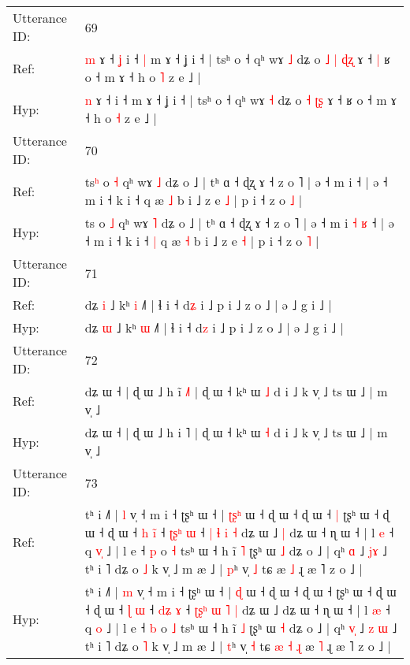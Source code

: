 \documentclass[10pt]{article}
\DeclareRobustCommand{\hl}[1]{{\textcolor{red}{#1}}}
\begin{document}
\begin{longtable}{ll}
 \\
\midrule
Utterance ID: & 69 \\
Ref: & \hl{m} ɤ ˧\hl{ }\hl{ʝ} i ˧\hl{ }\hl{|} m ɤ ˧ ʝ i ˧ | tsʰ o ˧ qʰ wɤ \hl{˩} dʑ o\hl{ }\hl{˩} \hl{|} \hl{ɖ}\hl{ʐ} ɤ ˧\hl{ }\hl{|} ʁ o ˧ m ɤ ˧ h o \hl{˥} z e ˩ |
 \\
Hyp: & \hl{n} ɤ ˧\hl{}\hl{} i ˧\hl{}\hl{} m ɤ ˧ ʝ i ˧ | tsʰ o ˧ qʰ wɤ \hl{˧} dʑ o\hl{}\hl{} \hl{˧} \hl{ʈ}\hl{ʂ} ɤ ˧\hl{}\hl{} ʁ o ˧ m ɤ ˧ h o \hl{˧} z e ˩ |
 \\
\midrule
Utterance ID: & 70 \\
Ref: & ts\hl{ʰ} o \hl{˧} qʰ wɤ \hl{˩} dʑ o ˩ | tʰ ɑ ˧ ɖʐ ɤ ˧ z o ˥ | ə ˧ m i\hl{}\hl{}\hl{}\hl{} ˧ | ə ˧ m i ˧ k i ˧\hl{}\hl{} q æ \hl{˩} b i ˩ z e \hl{˩} | p i ˧ z o \hl{˩} |
 \\
Hyp: & ts\hl{} o \hl{˩} qʰ wɤ \hl{˥} dʑ o ˩ | tʰ ɑ ˧ ɖʐ ɤ ˧ z o ˥ | ə ˧ m i\hl{ }\hl{˧}\hl{ }\hl{ʁ} ˧ | ə ˧ m i ˧ k i ˧\hl{ }\hl{|} q æ \hl{˧} b i ˩ z e \hl{˧} | p i ˧ z o \hl{˥} |
 \\
\midrule
Utterance ID: & 71 \\
Ref: & dʑ \hl{i} ˩ kʰ \hl{i} ˩˥ | ɬ i ˧ d\hl{ʑ} i ˩ p i ˩ z o ˩ | ə ˩ g i ˩ |
 \\
Hyp: & dʑ \hl{ɯ} ˩ kʰ \hl{ɯ} ˩˥ | ɬ i ˧ d\hl{z} i ˩ p i ˩ z o ˩ | ə ˩ g i ˩ |
 \\
\midrule
Utterance ID: & 72 \\
Ref: & dʑ ɯ ˧ | ɖ ɯ ˩ h i\hl{̃} \hl{˩}˥ | ɖ ɯ ˧ kʰ ɯ \hl{˩} d i ˩ k v̩ ˩ ts ɯ ˩ | m v̩ ˩
 \\
Hyp: & dʑ ɯ ˧ | ɖ ɯ ˩ h i\hl{} \hl{}˥ | ɖ ɯ ˧ kʰ ɯ \hl{˧} d i ˩ k v̩ ˩ ts ɯ ˩ | m v̩ ˩
 \\
\midrule
Utterance ID: & 73 \\
Ref: & tʰ i ˩˥ | \hl{l} v̩ ˧ m i ˧ ʈʂʰ ɯ ˧ | \hl{ʈ}\hl{ʂ}\hl{ʰ} ɯ ˧ ɖ ɯ ˧ ɖ ɯ ˧\hl{ }\hl{|} ʈʂʰ ɯ ˧ ɖ ɯ ˧ ɖ ɯ ˧ \hl{h} \hl{i}\hl{̃} ˧ \hl{ʈ}\hl{ʂ}\hl{ʰ} \hl{ɯ} ˧ \hl{}\hl{}\hl{|} \hl{ɬ} \hl{i} \hl{˧} dʑ ɯ ˩\hl{ }\hl{|} dʑ ɯ ˧ ɳ ɯ ˧ | l \hl{e} ˧ q \hl{v}\hl{̩} ˩ | l e ˧ \hl{p} o \hl{˧} tsʰ ɯ ˧ h ĩ \hl{˥} ʈʂʰ ɯ \hl{˩} dʑ o ˩ | qʰ \hl{}\hl{ɑ} ˩ \hl{}\hl{j}\hl{ɤ} ˩ tʰ i ˥ dʑ o \hl{˩} k v̩ ˩ m æ ˩ | \hl{p}ʰ v̩ \hl{˩} tɕ\hl{}\hl{}\hl{}\hl{}\hl{}\hl{} æ \hl{˩} ɻ æ ˥ z o ˩ |
 \\
Hyp: & tʰ i ˩˥ | \hl{m} v̩ ˧ m i ˧ ʈʂʰ ɯ ˧ | \hl{}\hl{}\hl{ɖ} ɯ ˧ ɖ ɯ ˧ ɖ ɯ ˧\hl{}\hl{} ʈʂʰ ɯ ˧ ɖ ɯ ˧ ɖ ɯ ˧ \hl{ɭ} \hl{}\hl{ɯ} ˧ \hl{}\hl{d}\hl{ʑ} \hl{ɤ} ˧ \hl{ʈ}\hl{ʂ}\hl{ʰ} \hl{ɯ} \hl{˥} \hl{|} dʑ ɯ ˩\hl{}\hl{} dʑ ɯ ˧ ɳ ɯ ˧ | l \hl{æ} ˧ q \hl{}\hl{o} ˩ | l e ˧ \hl{b} o \hl{˩} tsʰ ɯ ˧ h ĩ \hl{˩} ʈʂʰ ɯ \hl{˧} dʑ o ˩ | qʰ \hl{v}\hl{̩} ˩ \hl{z}\hl{ }\hl{ɯ} ˩ tʰ i ˥ dʑ o \hl{˥} k v̩ ˩ m æ ˩ | \hl{t}ʰ v̩ \hl{˧} tɕ\hl{ }\hl{æ}\hl{ }\hl{˧}\hl{ }\hl{ɻ} æ \hl{˥} ɻ æ ˥ z o ˩ |

\end{longtable}
\end{document}
